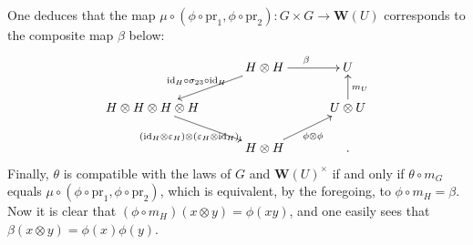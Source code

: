 One deduces that the map $\mu\circ(\phi\circ\mathrm{pr}_1,\phi\circ\mathrm{pr}_2):G\times G\to\mathbf W(U)$ corresponds to the composite map $\beta$ below:
\[
\xymatrix@C=30pt@R=18pt{
&H\otimes H\ar[r]^\beta\ar[dl]_{\mathrm{id}_H\circ\sigma_{23}\circ\mathrm{id}_H}&U\\
H\otimes H\otimes H\otimes H\ar[dr]_{(\mathrm{id}_H\otimes\varepsilon_H)\otimes(\varepsilon_H\otimes\mathrm{id}_H)}&&U\otimes U\ar[u]_{m_U}\\
&H\otimes H\ar[ur]_{\phi\otimes\phi}&.}
\]
Finally, $\theta$ is compatible with the laws of $G$ and $\mathbf W(U)^\times$ if and only if $\theta\circ m_G$ equals $\mu\circ(\phi\circ\mathrm{pr}_1,\phi\circ\mathrm{pr}_2)$, which is equivalent, by the foregoing, to $\phi\circ m_H=\beta$. Now it is clear that $(\phi\circ m_H)(x\otimes y)=\phi(xy)$, and one easily sees that $\beta(x\otimes y)=\phi(x)\phi(y)$.

